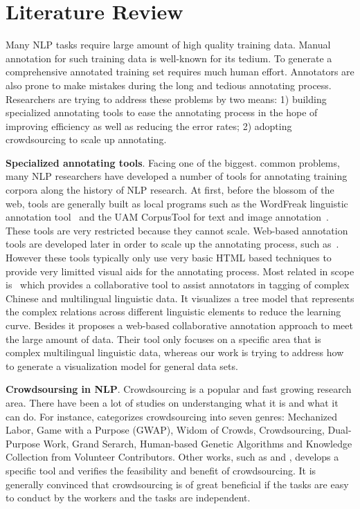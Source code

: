 \section{Literature Review}

Many NLP tasks require large amount of high quality training data.
Manual annotation for such training data is well-known for its tedium.
To generate a comprehensive annotated training set requires much human
effort. Annotators are also prone to make mistakes during the long and
tedious annotating process.  Researchers are trying to address these
problems by two means: 1) building specialized annotating tools to
ease the annotating process in the hope of improving efficiency as
well as reducing the error rates; 2) adopting crowdsourcing to scale
up annotating.

\textbf{Specialized annotating tools}. Facing one of the biggest.
common problems, many NLP researchers have developed a number of tools
for annotating training corpora along the history of NLP research. At
  first, before the blossom of the web, tools are generally built as
  local programs such as the WordFreak linguistic annotation
  tool~\cite{Morton2003WOT} and the  UAM CorpusTool for
  text and image annotation~\cite{ODonnell2008DUC}.
  These tools are very restricted because they cannot scale. Web-based
  annotation tools are developed later in order to scale up the
  annotating process, such as~\cite{Stuhrenberg2007WAA}.
  However these tools typically only use very basic HTML based
  techniques to provide very limitted visual aids for the annotating
  process. Most related in scope is~\cite{yan2012collaborative} which
  provides a collaborative tool to assist annotators in tagging of
  complex Chinese and multilingual linguistic data. It visualizes a
  tree model that represents the complex relations across different
  linguistic elements to reduce the learning curve. Besides it
  proposes a web-based collaborative annotation approach to meet the
  large amount of data.  Their tool only focuses on a specific area
  that is complex multilingual linguistic data, whereas our work is
  trying to address how to generate a visualization model for general
  data sets.


\textbf{Crowdsoursing in NLP}. Crowdsourcing \cite{howe2006rise} is a
popular and fast growing research area. There have been a lot of
studies on understanging what it is and what it can do. For instance,
\cite{quinn2009taxonomy} categorizes crowdsourcing into seven genres:
Mechanized Labor, Game with a Purpose (GWAP), Widom of Crowds,
Crowdsourcing, Dual-Purpose Work, Grand Serarch, Human-based Genetic
Algorithms and Knowledge Collection from Volunteer Contributors. Other
works, such as \cite{abekawa2010community} and \cite{irvine2010using},
develops a specific tool and verifies the feasibility and benefit of
crowdsourcing. It is generally convinced that crowdsourcing is of
great beneficial if the tasks are easy to conduct by the workers and
the tasks are independent.

